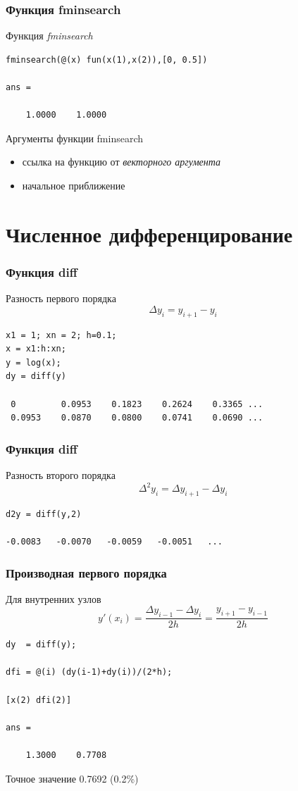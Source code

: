 \documentclass[11pt, compress]{beamer}
\begin{document}
\begin{frame}[c,fragile]
\frametitle{Функция fminsearch}
Функция \emph{fminsearch}
\begin{lstlisting}
fminsearch(@(x) fun(x(1),x(2)),[0, 0.5])

ans =

    1.0000    1.0000
\end{lstlisting}
Аргументы функции fminsearch
\begin{itemize}
    \item ссылка на функцию от \emph{векторного аргумента}
    \item начальное приближение
\end{itemize}
\end{frame} 


\section{Численное дифференцирование}

\begin{frame}[t,fragile]
\frametitle{Функция diff}
Разность первого порядка
$$
	\Delta y_i = y_{i+1} - y_{i}
$$
\begin{lstlisting}
x1 = 1; xn = 2; h=0.1;
x = x1:h:xn;
y = log(x);
dy = diff(y)

 0         0.0953    0.1823    0.2624    0.3365 ...
 0.0953    0.0870    0.0800    0.0741    0.0690 ...
\end{lstlisting}
\end{frame}

\begin{frame}[t,fragile]
\frametitle{Функция diff}
Разность второго порядка
$$
	\Delta^2 y_i = \Delta y_{i+1} - \Delta y_{i}
$$
\begin{lstlisting}
d2y = diff(y,2)

-0.0083   -0.0070   -0.0059   -0.0051   ...
\end{lstlisting}
\end{frame}

\begin{frame}[t,fragile]
\frametitle{Производная первого порядка}
Для внутренних узлов
$$
	y'(x_i) = \frac{\Delta y_{i-1} - \Delta y_{i}}{2h} = \frac{y_{i+1} - y_{i-1}}{2h}
$$
\begin{lstlisting}
dy  = diff(y);

dfi = @(i) (dy(i-1)+dy(i))/(2*h);

[x(2) dfi(2)]

ans =

    1.3000    0.7708
\end{lstlisting}
Точное значение 0.7692 (0.2\%)
\end{frame}
\end{document}
